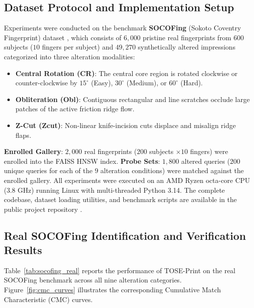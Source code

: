 \documentclass[lettersize,journal]{IEEEtran}
\begin{document}
\subsection{Dataset Protocol and Implementation Setup}
Experiments were conducted on the benchmark \textbf{SOCOFing} (Sokoto Coventry Fingerprint) dataset \cite{b36}, which consists of $6,000$ pristine real fingerprints from $600$ subjects ($10$ fingers per subject) and $49,270$ synthetically altered impressions categorized into three alteration modalities:
\begin{itemize}
    \item \textbf{Central Rotation (CR)}: The central core region is rotated clockwise or counter-clockwise by $15^\circ$ (Easy), $30^\circ$ (Medium), or $60^\circ$ (Hard).
    \item \textbf{Obliteration (Obl)}: Contiguous rectangular and line scratches occlude large patches of the active friction ridge flow.
    \item \textbf{Z-Cut (Zcut)}: Non-linear knife-incision cuts displace and misalign ridge flaps.
\end{itemize}

\textbf{Enrolled Gallery}: $2,000$ real fingerprints ($200$ subjects $\times 10$ fingers) were enrolled into the FAISS HNSW index. \textbf{Probe Sets}: $1,800$ altered queries ($200$ unique queries for each of the $9$ alteration conditions) were matched against the enrolled gallery. All experiments were executed on an AMD Ryzen octa-core CPU (3.8 GHz) running Linux with multi-threaded Python 3.14. The complete codebase, dataset loading utilities, and benchmark scripts are available in the public project repository \cite{b_repo}.

\subsection{Real SOCOFing Identification and Verification Results}
Table~\ref{tab:socofing_real} reports the performance of TOSE-Print on the real SOCOFing benchmark across all nine alteration categories. Figure~\ref{fig:cmc_curves} illustrates the corresponding Cumulative Match Characteristic (CMC) curves.
\end{document}
